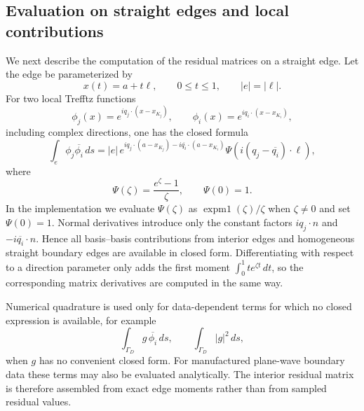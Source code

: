 \documentclass[pdflatex,sn-mathphys-num]{sn-jnl}
\theoremstyle{thmstyleone}
\theoremstyle{thmstyletwo}
\begin{document}
\subsection{Evaluation on straight edges and local contributions}\label{subsec:exact-edge}
We next describe the computation of the residual matrices on a straight edge.  Let the edge be parameterized by
\[
 x(t)=a+t\ell,\qquad 0\le t\le1,\qquad |e|=|\ell|.
\]
For two local Trefftz functions
\[
 \phi_j(x)=e^{iq_j\cdot(x-x_{K_j})},\qquad
 \phi_i(x)=e^{iq_i\cdot(x-x_{K_i})},
\]
including complex directions, one has the closed formula
\begin{equation}\label{eq:edge-exp-integral}
 \int_e\phi_j\overline{\phi_i}\,ds
 =|e|\,e^{iq_j\cdot(a-x_{K_j})-i\overline{q_i}\cdot(a-x_{K_i})}
 \Psi\!\left(i(q_j-\overline{q_i})\cdot\ell\right),
\end{equation}
where
\[
 \Psi(\zeta)=\frac{e^\zeta-1}{\zeta},\qquad \Psi(0)=1.
\]
In the implementation we evaluate $\Psi(\zeta)$ as $\operatorname{expm1}(\zeta)/\zeta$ when $\zeta\ne0$ and set $\Psi(0)=1$.  Normal derivatives introduce only the constant factors $iq_j\cdot n$ and $-i\overline{q_i}\cdot n$.  Hence all basis--basis contributions from interior edges and homogeneous straight boundary edges are available in closed form.  Differentiating with respect to a direction parameter only adds the first moment $\int_0^1t e^{\zeta t}\,dt$, so the corresponding matrix derivatives are computed in the same way.

Numerical quadrature is used only for data-dependent terms for which no closed expression is available, for example
\[
 \int_{\Gamma_D}g\,\overline{\phi_i}\,ds,
 \qquad
 \int_{\Gamma_D}|g|^2\,ds,
\]
when $g$ has no convenient closed form.  For manufactured plane-wave boundary data these terms may also be evaluated analytically.  The interior residual matrix is therefore assembled from exact edge moments rather than from sampled residual values.
\end{document}
